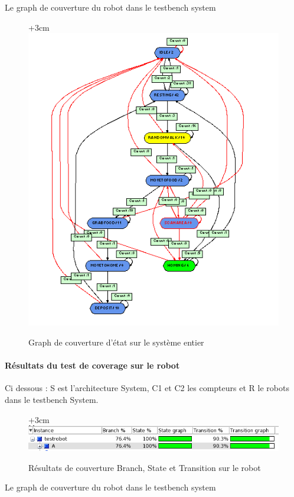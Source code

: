\documentclass{article}
\begin{document}
Le graph de couverture du robot dans le testbench system

\begin{figure}[!h]
\advance\leftskip+3cm
\includegraphics[scale=0.80]{PremiereAnalyse/graph.PNG}
\caption{Graph de couverture d'état sur le système entier}
\end{figure}

\paragraph{Résultats du test de coverage sur le robot}

Ci dessous : S est l'architecture System, C1 et C2 les compteurs et R le robots dans le testbench System.
\begin{figure}[!h]
\advance\leftskip+3cm
\includegraphics[scale=0.70]{PremiereAnalyse/coverRobot.PNG}
\caption{Résultats de couverture Branch, State et Transition sur le robot}
\end{figure}

Le graph de couverture du robot dans le testbench system
\end{document}
